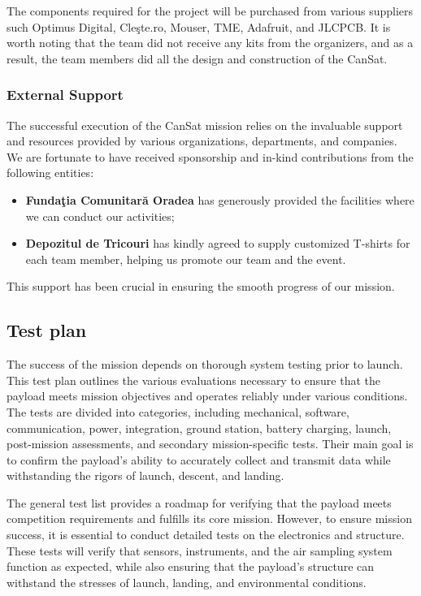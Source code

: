 The components required for the project will be purchased from various suppliers such Optimus Digital, Cle\c{s}te.ro, Mouser, TME, Adafruit, and JLCPCB. It is worth noting that the team did not receive any kits from the organizers, and as a result, the team members did all the design and construction of the CanSat.

\subsubsection{External Support}
The successful execution of the CanSat mission relies on the invaluable support and resources provided by various organizations, departments, and companies. We are fortunate to have received sponsorship and in-kind contributions from the following entities:
\begin{itemize}[leftmargin=1cm, itemindent=0.25cm, noitemsep, topsep=0pt, label=$\bullet$]
\item \textbf{Fundaţia Comunitară Oradea} has generously provided the facilities where we can conduct our activities;
\item \textbf{Depozitul de Tricouri} has kindly agreed to supply customized T-shirts for each team member, helping us promote our team and the event.
\end{itemize}

This support has been crucial in ensuring the smooth progress of our mission.


\subsection{Test plan}

The success of the mission depends on thorough system testing prior to launch. This test plan outlines the various evaluations necessary to ensure that the payload meets mission objectives and operates reliably under various conditions. The tests are divided into categories, including mechanical, software, communication, power, integration, ground station, battery charging, launch, post-mission assessments, and secondary mission-specific tests. Their main goal is to confirm the payload’s ability to accurately collect and transmit data while withstanding the rigors of launch, descent, and landing.

The general test list provides a roadmap for verifying that the payload meets competition requirements and fulfills its core mission. However, to ensure mission success, it is essential to conduct detailed tests on the electronics and structure. These tests will verify that sensors, instruments, and the air sampling system function as expected, while also ensuring that the payload's structure can withstand the stresses of launch, landing, and environmental conditions.

